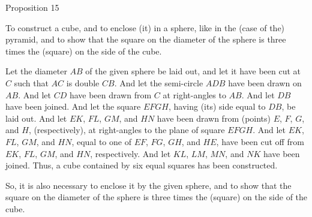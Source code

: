 
\begin{center}
{\large Proposition 15}
\end{center}

To construct a cube, and to enclose (it) in a sphere, like in the (case of the)
pyramid, and to show that the square on the diameter of the sphere
is three times the (square) on the side of the cube.

Let the diameter $AB$ of the given sphere be laid out, and let it have been
cut at $C$ such that $AC$ is double $CB$. And let the semi-circle
$ADB$ have been drawn on $AB$. And let $CD$ have been drawn from $C$
at right-angles to $AB$. And let $DB$ have been joined. And let the
square $EFGH$, having (its) side equal to $DB$, be laid out. And
let $EK$, $FL$, $GM$, and $HN$ have been drawn from (points)
$E$, $F$, $G$, and $H$, (respectively), at right-angles to the plane of
square $EFGH$. And let $EK$, $FL$, $GM$, and $HN$, equal
to one of $EF$, $FG$, $GH$, and $HE$, have been cut off from
$EK$, $FL$, $GM$, and $HN$, respectively. And let $KL$,
$LM$, $MN$, and $NK$ have been joined. Thus, a cube contained
by six equal squares has been constructed. 

So, it is also necessary
to enclose it by the given sphere, and to show that the square on
the diameter of the sphere is three times the (square) on the side of the cube.

\centerline{}

